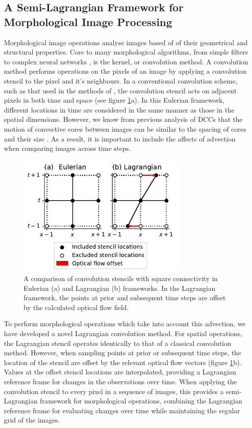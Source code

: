 \documentclass[amt, manuscript]{copernicus}
\begin{document}
\subsection{A Semi-Lagrangian Framework for Morphological Image Processing}

Morphological image operations analyse images based of of their geometrical and structural properties.
Core to many morphological algorithms, from simple filters to complex neural networks \citep{kalchbrenner_convolutional_2014}, is the kernel, or convolution method.
A convolution method performs operations on the pixels of an image by applying a convolution stencil to the pixel and it's neighbours.
In a conventional convolution scheme, such as that used in the methods of \citet{fiolleau_algorithm_2013}, the convolution stencil acts on adjacent pixels in both time and space (see figure \ref{fig:convolution_kernels}a).
In this Eulerian framework, different locations in time are considered in the same manner as those in the spatial dimensions.
However, we know from previous analysis of DCCs that the motion of convective cores between images can be similar to the spacing of cores and their size \citep{heikenfeld_tobac_2019}.
As a result, it is important to include the affects of advection when comparing images across time steps.


\begin{figure}[t]
    \includegraphics[width=8.3cm]{figure05.pdf}
    \caption{A comparison of convolution stencils with square connectivity in Eulerian (a) and Lagrangian (b) frameworks. In the Lagrangian framework, the points at prior and subsequent time steps are offset by the calculated optical flow field.}
    \label{fig:convolution_kernels}
\end{figure}


To perform morphological operations which take into account this advection, we have developed a novel Lagrangian convolution method.
For spatial operations, the Lagrangian stencil operates identically to that of a classical convolution method.
However, when sampling points at prior or subsequent time steps, the location of the stencil are offset by the relevant optical flow vectors (figure \ref{fig:convolution_kernels}b).
Values at the offset stencil locations are interpolated, providing a Lagrangian reference frame for changes in the observations over time.
When applying the convolution stencil to every pixel in a sequence of images, this provides a semi-Lagrangian framework for morphological operations, combining the Lagrangian reference frame for evaluating changes over time while maintaining the regular grid of the images.
\end{document}
